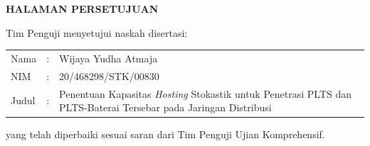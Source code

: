 \BgThispage
\centerline{\fontsize{14}{16}\textbf{HALAMAN PERSETUJUAN}}
\vspace*{27pt}
\noindent Tim Penguji menyetujui naskah disertasi:
\vspace*{-8pt}
{
\begin{longtable}{llp{330pt}}
\hspace*{-14pt} Nama	&:&Wijaya Yudha Atmaja\\
\hspace*{-14pt} NIM		&:&20/468298/STK/00830\\
\hspace*{-14pt} Judul	&:&Penentuan Kapasitas \textit{Hosting} Stokastik untuk Penetrasi PLTS dan PLTS-Baterai Tersebar pada Jaringan Distribusi
\end{longtable}
}
\vspace*{-22pt}
\noindent yang telah diperbaiki sesuai saran dari Tim Penguji Ujian Komprehensif.

